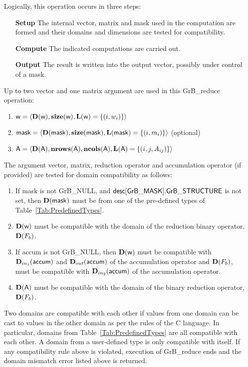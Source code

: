 Logically, this operation occurs in three steps:
\begin{enumerate}[leftmargin=0.75in]
\item[\bf Setup] The internal vector, matrix and mask used in the computation are formed 
and their domains and dimensions are tested for compatibility.
\item[\bf Compute] The indicated computations are carried out.
\item[\bf Output] The result is written into the output vector, possibly under 
control of a mask.
\end{enumerate}

Up to two vector and one matrix argument are used in this {\sf GrB\_reduce} operation:
\begin{enumerate}
	\item ${\sf w} = \langle \bold{D}({\sf w}),\bold{size}({\sf w}),
    \bold{L}({\sf w}) = \{(i,w_i) \} \rangle$

	\item ${\sf mask} = \langle \bold{D}({\sf mask}),\bold{size}({\sf mask}),
    \bold{L}({\sf mask}) = \{(i,m_i) \} \rangle$ (optional)

	\item ${\sf A} = \langle \bold{D}({\sf A}),\bold{nrows}({\sf A}),
    \bold{ncols}({\sf A}),\bold{L}({\sf A}) = \{(i,j,A_{ij}) \} \rangle$
\end{enumerate}

The argument vector, matrix, reduction operator and accumulation 
operator (if provided) are tested for domain compatibility as follows:
\begin{enumerate}
	\item If {\sf mask} is not {\sf GrB\_NULL}, and ${\sf desc[GrB\_MASK].GrB\_STRUCTURE}$
    is not set, then $\bold{D}({\sf mask})$ must be from one of the pre-defined types of 
    Table~\ref{Tab:PredefinedTypes}.

	\item $\bold{D}({\sf w})$ must be 
    compatible with the domain of the reduction binary operator, $\bold{D}(F_b)$.

	\item If {\sf accum} is not {\sf GrB\_NULL}, then $\bold{D}({\sf w})$ must be
    compatible with $\mbox{$\mathbf{D}_{in_{1}}$}({\sf accum})$ and $\mbox{$\mathbf{D}_{out}$}({\sf accum})$ of the accumulation operator and 
    $\bold{D}(F_b)$, must be compatible with $\mbox{$\mathbf{D}_{in_{2}}$}({\sf accum})$ of the accumulation operator.

	\item $\bold{D}({\sf A})$ must be compatible with the domain of the binary reduction operator, $\bold{D}(F_b)$.
\end{enumerate}
Two domains are compatible with each other if values from one domain can be cast 
to values in the other domain as per the rules of the C language.
In particular, domains from Table~\ref{Tab:PredefinedTypes} are all compatible 
with each other. A domain from a user-defined type is only compatible with itself.
If any compatibility rule above is violated, execution of {\sf GrB\_reduce} ends
and the domain mismatch error listed above is returned.

